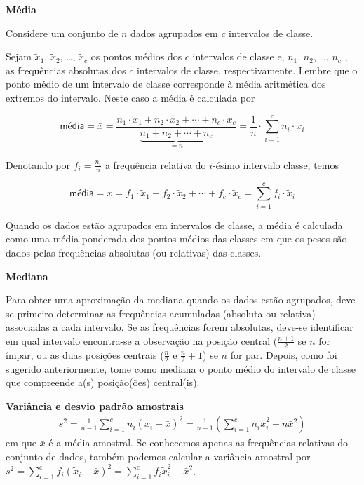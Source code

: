 \label{\detokenize{PE104-A:sec-para-saber-mais}}\label{\detokenize{PE104-A::doc}}\label{\detokenize{PE104-A:para-saber-mais}}


\textbf{Média}

Considere um conjunto de \(n\) dados agrupados em \(c\) intervalos de classe.

Sejam \(\tilde{x}_{1}\), \(\tilde{x}_{2}\), …, \(\tilde{x}_{c}\) os pontos médios dos \(c\) intervalos de classe e, \(n_1\), \(n_2\), …, \(n_c\) ,  as frequências absolutas dos \(c\) intervalos de classe, respectivamente. Lembre que o ponto médio de um intervalo de classe  corresponde à média aritmética dos extremos do intervalo. Neste caso a média é calculada por

$$\textsf{média}=\bar{x}=\frac{n_1\cdot \tilde{x}_{1}+n_2\cdot \tilde{x}_{2}+\cdots+n_c\cdot \tilde{x}_{c}}{\underbrace{n_1+n_2+\cdots+n_c}_{=n}}=\frac{1}{n}\cdot \displaystyle{\sum^c_{i=1}}n_i\cdot \tilde{x}_i$$

Denotando por \(f_i=\frac{n_i}{n}\) a frequência relativa do \(i\)-ésimo intervalo classe, temos

$$\textsf{média}=\bar{x}=f_1\cdot \tilde{x}_{1}+f_2\cdot \tilde{x}_{2}+\cdots +f_c\cdot \tilde{x}_{c}=\displaystyle{\sum^c_{i=1}}f_i\cdot \tilde{x}_i$$

Quando os dados estão agrupados em intervalos de classe, a média é calculada como uma média ponderada dos pontos médios das classes em que os pesos são dados pelas frequências absolutas (ou relativas) das classes.

\textbf{Mediana}

Para obter uma aproximação da mediana quando os dados estão agrupados, deve-se primeiro determinar as frequências acumuladas (absoluta ou relativa) associadas a cada intervalo. Se as frequências forem absolutas, deve-se identificar em qual intervalo encontra-se a observação na posição central (\(\frac{n+1}{2}\) se \(n\) for ímpar, ou as duas posições centrais (\(\frac{n}{2}\) e \(\frac{n}{2}+1\)) se \(n\) for par. Depois, como foi sugerido anteriormente, tome como mediana o ponto médio do intervalo de classe que compreende a(s) posição(ões) central(is).

\textbf{Variância e desvio padrão amostrais}
\begin{equation*}
\begin{split}s^2 = \frac{1}{n-1}\sum^c_{i=1}n_i(\tilde{x}_i-\bar{x})^2=\frac{1}{n-1}\left(\sum^c_{i=1}n_i\tilde{x}^2_i- n\bar{x}^2\right )\end{split}
\end{equation*}
em que \(\bar{x}\) é a média amostral. Se conhecemos apenas as frequências relativas do conjunto de dados, também podemos calcular a variância amostral por \(s^2=\displaystyle{\sum^c_{i=1}}f_i(\tilde{x}_i-\bar{x})^2=\displaystyle{\sum^c_{i=1}}f_i\tilde{x}^2_i -\bar{x}^2\).

